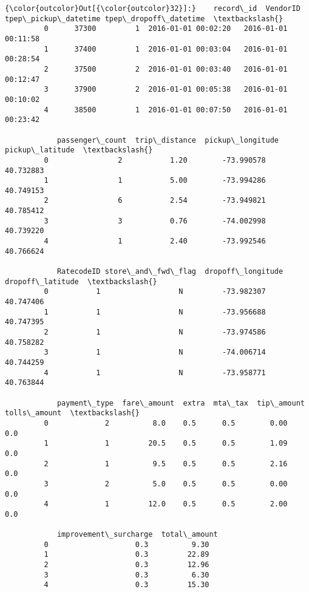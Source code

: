 \documentclass[11pt]{article}
\begin{document}
\begin{Verbatim}[commandchars=\\\{\}]
{\color{outcolor}Out[{\color{outcolor}32}]:}    record\_id  VendorID tpep\_pickup\_datetime tpep\_dropoff\_datetime  \textbackslash{}
         0      37300         1  2016-01-01 00:02:20   2016-01-01 00:11:58   
         1      37400         1  2016-01-01 00:03:04   2016-01-01 00:28:54   
         2      37500         2  2016-01-01 00:03:40   2016-01-01 00:12:47   
         3      37900         2  2016-01-01 00:05:38   2016-01-01 00:10:02   
         4      38500         1  2016-01-01 00:07:50   2016-01-01 00:23:42   
         
            passenger\_count  trip\_distance  pickup\_longitude  pickup\_latitude  \textbackslash{}
         0                2           1.20        -73.990578        40.732883   
         1                1           5.00        -73.994286        40.749153   
         2                6           2.54        -73.949821        40.785412   
         3                3           0.76        -74.002998        40.739220   
         4                1           2.40        -73.992546        40.766624   
         
            RatecodeID store\_and\_fwd\_flag  dropoff\_longitude  dropoff\_latitude  \textbackslash{}
         0           1                  N         -73.982307         40.747406   
         1           1                  N         -73.956688         40.747395   
         2           1                  N         -73.974586         40.758282   
         3           1                  N         -74.006714         40.744259   
         4           1                  N         -73.958771         40.763844   
         
            payment\_type  fare\_amount  extra  mta\_tax  tip\_amount  tolls\_amount  \textbackslash{}
         0             2          8.0    0.5      0.5        0.00           0.0   
         1             1         20.5    0.5      0.5        1.09           0.0   
         2             1          9.5    0.5      0.5        2.16           0.0   
         3             2          5.0    0.5      0.5        0.00           0.0   
         4             1         12.0    0.5      0.5        2.00           0.0   
         
            improvement\_surcharge  total\_amount  
         0                    0.3          9.30  
         1                    0.3         22.89  
         2                    0.3         12.96  
         3                    0.3          6.30  
         4                    0.3         15.30  
\end{Verbatim}
            
\end{document}
